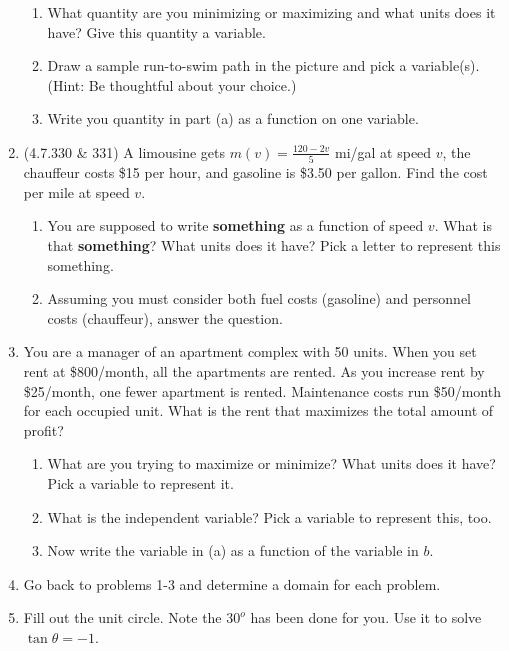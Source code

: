 \documentclass[12pt]{article}
\renewcommand{\emph}[1]{\textsf{\textbf{#1}}}
\begin{document}
\begin{enumerate}
\begin{enumerate}
	\item What quantity are you minimizing or maximizing and what units does it have? Give this quantity a variable.
	\item Draw a sample run-to-swim path in the picture and pick a variable(s). (Hint: Be thoughtful about your choice.)
	\item	Write you quantity in part (a) as a function on one variable.
\end{enumerate}
\vfill
\item (4.7.330 \& 331) A limousine gets $m(v)=\frac{120-2v}{5}$ mi/gal at speed $v$, the chauffeur costs \$15 per hour, and gasoline is \$3.50 per gallon. Find the cost per mile at speed $v.$
\begin{enumerate}
	\item You are supposed to write \emph{something} as a function of speed $v.$ What is that \emph{something}? What units does it have? Pick a letter to represent this something.
	\item Assuming you must consider both fuel costs (gasoline) and personnel costs (chauffeur), answer the question.
\end{enumerate}
\vfill
\newpage
\item You are a manager of an apartment complex with 50 units. When you set rent at \$800/month, all the apartments are rented. As you increase rent by \$25/month, one fewer apartment is rented. Maintenance costs run \$50/month for each occupied unit. What is the rent that maximizes the total amount of profit?
\begin{enumerate}
	\item What are you trying to maximize or minimize? What units does it have? Pick a variable to represent it.
	\item What is the independent variable? Pick a variable to represent this, too.
	\item Now write the variable in (a) as a function of the variable in $b$.
	\end{enumerate}
\vfill
\item Go back to problems 1-3 and determine a domain for each problem.
\item Fill out the unit circle. Note the $30^o$ has been done for you. Use it to solve $\tan \theta =-1.$\\

\end{enumerate}
\end{document}
